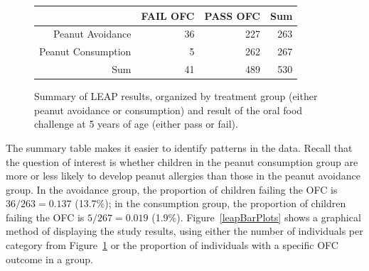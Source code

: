 \begin{figure}[ht]
\centering
\begin{tabular}{rrrr}
  \hline
 & FAIL OFC & PASS OFC & Sum \\ 
  \hline
Peanut Avoidance & 36 & 227 & 263 \\ 
  Peanut Consumption & 5 & 262 & 267 \\ 
  Sum & 41 & 489 & 530 \\ 
   \hline
\end{tabular}
\caption{Summary of LEAP results, organized by treatment group (either peanut avoidance or consumption) and result of the oral food challenge at 5 years of age (either pass or fail).} 
\label{leapStudyResults}
\end{figure}

\textD{\newpage}

The summary table makes it easier to identify patterns in the data. Recall that the question of interest is whether children in the peanut consumption group are more or less likely to develop peanut allergies than those in the peanut avoidance group. In the avoidance group, the proportion of children failing the OFC is $36/263 = 0.137$ (13.7\%); in the consumption group, the proportion of children failing the OFC is $5/267 = 0.019$ (1.9\%).  Figure~\ref{leapBarPlots} shows a graphical method of displaying the study results, using either the number of individuals per category from Figure~\ref{leapStudyResults} or the proportion of individuals with a specific OFC outcome in a group. 

